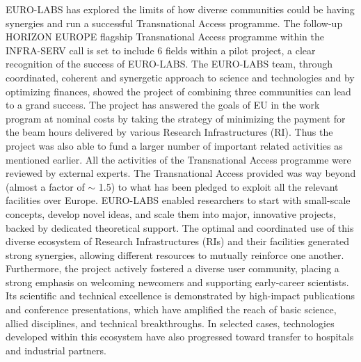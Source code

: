 EURO-LABS has explored the limits of how diverse communities could be having synergies and run a successful Transnational Access programme. The follow-up HORIZON EUROPE flagship Transnational Access programme within the INFRA-SERV call is set to include 6 fields within a pilot project, a clear recognition of the success of EURO-LABS. The EURO-LABS team, through coordinated, coherent and synergetic approach to science and technologies and by optimizing finances, showed the project of combining three communities can lead to a grand success. The project has answered the goals of EU in the work program at nominal costs by taking the strategy of minimizing the payment for the beam hours delivered by various Research Infrastructures (RI). Thus the project was also able to fund a larger number of important related activities as mentioned earlier. All the activities of the Transnational Access programme were reviewed by external experts. The Transnational Access provided was way beyond (almost a factor of $\sim$ 1.5) to what has been pledged to exploit all the relevant facilities over Europe. 
EURO-LABS enabled researchers to start with small-scale concepts, develop novel ideas, and scale them into major, innovative projects, backed by dedicated theoretical support. The optimal and coordinated use of this diverse ecosystem of Research Infrastructures (RIs) and their facilities generated strong synergies, allowing different resources to mutually reinforce one another. Furthermore, the project actively fostered a diverse user community, placing a strong emphasis on welcoming newcomers and supporting early-career scientists. Its scientific and technical excellence is demonstrated by high-impact publications and conference presentations, which have amplified the reach of basic science, allied disciplines, and technical breakthroughs. In selected cases, technologies developed within this ecosystem have also progressed toward transfer to hospitals and industrial partners.

